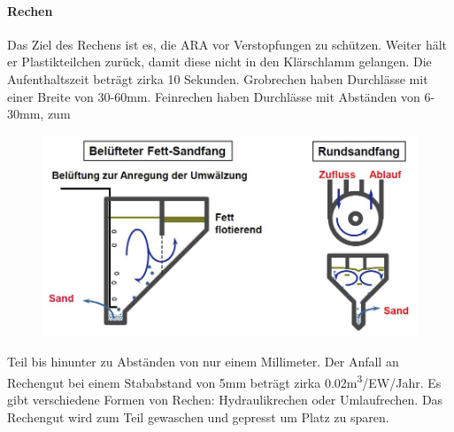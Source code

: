 \documentclass[9pt, openright=false]{scrartcl}
\begin{document}
\paragraph{Rechen} Das Ziel des Rechens ist es, die ARA vor Verstopfungen zu schützen. Weiter hält er Plastikteilchen zurück, damit diese nicht in den Klärschlamm gelangen. Die Aufenthaltszeit beträgt zirka 10 Sekunden. Grobrechen haben Durchlässe mit einer Breite von 30-60mm. Feinrechen haben Durchlässe mit Abständen von 6-30mm, zum\begin{figure} 
  \includegraphics[width=.45\textwidth]{images/sandfang}
\end{figure} Teil bis hinunter zu Abständen von nur einem Millimeter. Der Anfall an Rechengut bei einem Stababstand von 5mm beträgt zirka 0.02m\textsuperscript{3}/EW/Jahr. Es gibt verschiedene Formen von Rechen: Hydraulikrechen oder Umlaufrechen. Das Rechengut wird zum Teil gewaschen und gepresst um Platz zu sparen.
\end{document}

